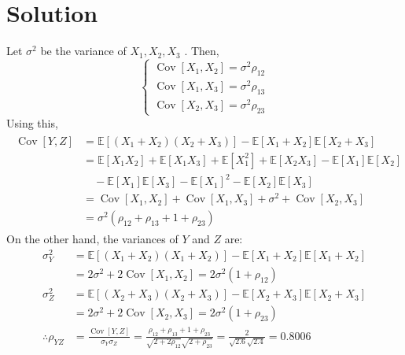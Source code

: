 \documentclass[10pt,a4paper,oneside]{article}
\begin{document}
\section* {Solution} 
Let $\sigma^{2}$ be the variance of $X_{1}, X_{2}, X_{3}$ . Then,
\[\left\{\begin{array}{l}{\operatorname{Cov}\left[X_{1}, X_{2}\right]=\sigma^{2} \rho_{12}} \\ {\operatorname{Cov}\left[X_{1}, X_{3}\right]=\sigma^{2} \rho_{13}} \\ {\operatorname{Cov}\left[X_{2}, X_{3}\right]=\sigma^{2} \rho_{23}}\end{array}\right.\]
Using this,
\[
\begin{aligned} \begin{split}\operatorname{Cov}[Y, Z] &=\mathbb{E}\left[\left(X_{1}+X_{2}\right)\left(X_{2}+X_{3}\right)\right]-\mathbb{E}\left[X_{1}+X_{2}\right] \mathbb{E}\left[X_{2}+X_{3}\right] \\ &=\mathbb{E}\left[X_{1} X_{2}\right]+\mathbb{E}\left[X_{1} X_{3}\right]+\mathbb{E}\left[X_{1}^{2}\right]+\mathbb{E}\left[X_{2}X_{3}\right]-\mathbb{E}\left[X_{1}\right]\mathbb{E}\left[X_{2}\right]\\&\quad-\mathbb{E}\left[X_{1}\right]\mathbb{E}\left[X_{3}\right]-\mathbb{E}\left[X_{1}\right]^{2}-\mathbb{E}\left[X_{2}\right] \mathbb{E}\left[X_{3}\right] \\ &=\operatorname{Cov}\left[X_{1}, X_{2}\right]+\operatorname{Cov}\left[X_{1}, X_{3}\right]+\sigma^{2}+\operatorname{Cov}\left[X_{2}, X_{3}\right] \\ &=\sigma^{2}\left(\rho_{12}+\rho_{13}+1+\rho_{23}\right)\end{split} \end{aligned}
\]
On the other hand, the variances of $Y$ and $Z$ are:
\[
\begin{aligned} \sigma_{Y}^{2} &=\mathbb{E}\left[\left(X_{1}+X_{2}\right)\left(X_{1}+X_{2}\right)\right]-\mathbb{E}\left[X_{1}+X_{2}\right] \mathbb{E}\left[X_{1}+X_{2}\right] \\ &=2 \sigma^{2}+2 \operatorname{Cov}\left[X_{1}, X_{2}\right]=2 \sigma^{2}\left(1+\rho_{12}\right) \\ \sigma_{Z}^{2} &=\mathbb{E}\left[\left(X_{2}+X_{3}\right)\left(X_{2}+X_{3}\right)\right]-\mathbb{E}\left[X_{2}+X_{3}\right] \mathbb{E}\left[X_{2}+X_{3}\right] \\ &=2 \sigma^{2}+2 \operatorname{Cov}\left[X_{2}, X_{3}\right]=2 \sigma^{2}\left(1+\rho_{23}\right) \\ \therefore \rho_{Y Z} &=\frac{\operatorname{Cov}[Y, Z]}{\sigma_{Y} \sigma_{Z}}=\frac{\rho_{12}+\rho_{13}+1+\rho_{23}}{\sqrt{2+2 \rho_{12}} \sqrt{2+\rho_{23}}}=\frac{2}{\sqrt{2.6} \sqrt{2.4}}=0.8006 \end{aligned}
\]
\end{document}

